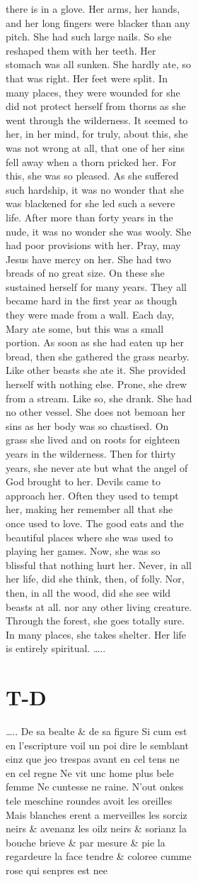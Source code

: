 \documentclass[
  letterpaper,
  DIV=11,
  numbers=noendperiod,
  oneside]{scrreprt}
\begin{document}
\begin{figure}
\begin{figure}
\begin{figure}
\begin{minipage}{0.20\linewidth}
there is in a glove. Her arms, her hands, and her long fingers were
{blacker than any pitch.} She had such large nails. So she reshaped them
with her teeth. Her stomach was all sunken. She hardly ate, so that was
right. Her feet were split. In many places, they were wounded for she
{did not} protect herself from thorns as she went through the
wilderness. It seemed to her, in her mind, for truly, about this, she
was {not} wrong {at all}, that one of her sins fell away when a thorn
pricked her. For this, she was so pleased. As she suffered such
hardship, {it was no wonder} that she was {blackened} for she led such a
severe life. After more than forty years in the nude, {it was no wonder}
she was wooly. She had poor provisions with her. Pray, may Jesus have
mercy on her. She had two breads of {no great size}. On these she
sustained herself for many years. They all became hard in the first year
as though they were made from a wall. Each day, Mary ate some, but this
was a small portion. As soon as she had eaten up her bread, then she
gathered the grass nearby. Like other beasts she ate it. She provided
herself with {nothing else}. Prone, she drew from a stream. Like so, she
drank. She had no other vessel. She {does not} bemoan her sins as her
body was so chastised. On grass she lived and on roots for eighteen
years in the wilderness. Then for thirty years, she {never} ate but what
the angel of God brought to her. Devils came to approach her. Often they
used to tempt her, making her remember all that she once used to love.
The good eats and the beautiful places where she was used to playing her
games. Now, she was so blissful {that {nothing} hurt her.} {Never}, in
all her life, {did} she think, then, of folly. {Nor}, then, in all the
wood, did she see wild beasts {at all}. {nor any} other living creature.
Through the forest, she goes totally sure. In many places, she takes
shelter. Her life is entirely spiritual. \ldots..

\end{minipage}%
%
\begin{minipage}{0.20\linewidth}

\section{T-D}\label{t-d-1}

\ldots.. De sa bealte \& de sa figure Si cum est en l'escripture voil un
poi dire le semblant einz que jeo trespas avant en cel tens ne en cel
regne {Ne} vit {unc} home plus bele femme {Ne} cuntesse {ne} raine.
{N'}out {onkes} tele meschine roundes avoit les oreilles Mais {blanches}
erent a merveilles les sorciz {neirs} \& avenanz les oilz {neirs} \&
sorianz la bouche brieve \& par mesure \& pie la regardeure la face
tendre \& {coloree} {cumme rose qui senpres est nee}


\end{minipage}
\end{figure}
\end{figure}
\end{figure}
\end{document}
